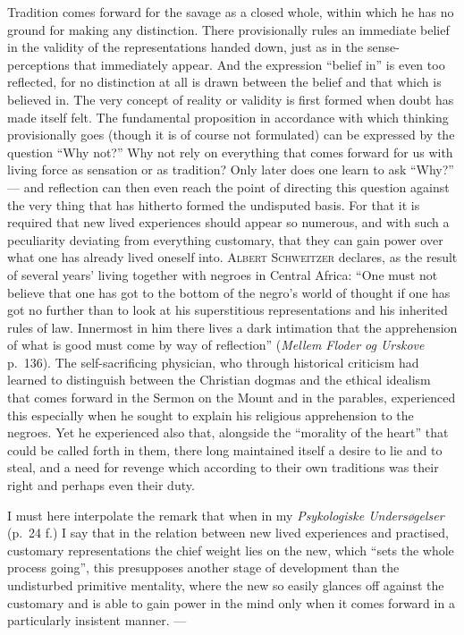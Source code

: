 \documentclass[12pt]{book}
\newcommand{\opage}[1]{\marginnote{\footnotesize\textit{[#1]}}}
\begin{document}
Tradition comes forward for the savage as a closed whole, within which he has
no ground for making any distinction. There provisionally rules an immediate
belief in the validity of the representations handed down, just as in the
sense-perceptions that immediately appear. And the expression ``belief in'' is
even too reflected, for no distinction at all is drawn between the belief and
that which is believed in. The very concept of reality or validity is first
formed when doubt has made itself felt. The fundamental proposition in
accordance with which thinking provisionally goes (though it is of course not
formulated) can be expressed by the question ``Why not?'' Why not rely on
everything that comes forward for us with living force as sensation or as
tradition? Only later does one learn to ask ``Why?'' --- and reflection can
then even reach the point of directing this question against the very thing
that has hitherto formed the undisputed basis. For that it is required that new
lived experiences should appear so numerous, and with such a peculiarity
deviating from everything customary, that they can gain power over what one has
already lived oneself into. \textsc{Albert Schweitzer} declares, as the result
of several years' living together with negroes in Central Africa: ``One must
not believe that one has got to the bottom of the negro's world of thought if
one has got no further than to look at his superstitious representations and
his inherited rules of law. Innermost in him there lives a dark intimation that
the apprehension of what is good must come by way of reflection'' (\textit{Mellem
Floder og Urskove} p.\ 136). The self-sacrificing physician, who through
historical criticism \opage{13}had learned to distinguish between the Christian dogmas
and the ethical idealism that comes forward in the Sermon on the Mount and in
the parables, experienced this especially when he sought to explain his
religious apprehension to the negroes. Yet he experienced also that, alongside
the ``morality of the heart'' that could be called forth in them, there long
maintained itself a desire to lie and to steal, and a need for revenge which
according to their own traditions was their right and perhaps even their duty.

I must here interpolate the remark that when in my \textit{Psykologiske
Undersøgelser} (p.\ 24 f.) I say that in the relation between new lived
experiences and practised, customary representations the chief weight lies on
the new, which ``sets the whole process going'', this presupposes another stage
of development than the undisturbed primitive mentality, where the new so
easily glances off against the customary and is able to gain power in the mind
only when it comes forward in a particularly insistent manner. ---
\end{document}
